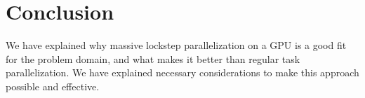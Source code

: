 \chapter{Conclusion}

We have explained why massive lockstep parallelization on a GPU is a good fit for the problem domain, and what makes it better than regular task parallelization. We have explained necessary considerations to make this approach possible and effective.
